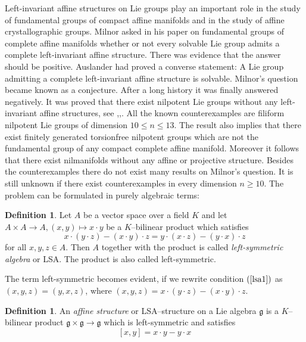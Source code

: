\documentclass[12pt]{amsart}
\theoremstyle{definition}
\newtheorem{defi}[thm]{Definition}
\theoremstyle{remark}
\newcommand{\Lg}{\mathfrak{g}}
\begin{document}
Left-invariant affine structures on Lie groups play an important role
in the study of fundamental groups of compact affine manifolds
and in the study of affine crystallographic groups. 
Milnor asked in his paper \cite{M2} on fundamental groups of complete 
affine manifolds whether or not every solvable Lie group admits a complete
left-invariant affine structure. There was evidence that the answer should 
be positive. Auslander \cite{A2} had proved a converse statement:
A Lie group admitting a complete left-invariant affine structure is solvable.
Milnor's question became known as a conjecture.
After a long history it was finally answered negatively.
It was proved that there exist nilpotent Lie groups without any left-invariant
affine structures, see \cite{B2},\cite{BG},\cite{BU3}.
All the known counterexamples are filiform nilpotent Lie groups
of dimension $10\le n \le 13$.
The result also implies that there exist
finitely generated torsionfree nilpotent groups which are not the fundamental
group of any compact complete affine manifold.
Moreover it follows that there exist nilmanifolds without any affine or
projective structure. 
Besides the counterexamples there do not exist many results on
Milnor's question. It is still unknown if there exist counterexamples
in every dimension $n\ge 10$.  
The problem can be formulated in purely algebraic terms: 

\begin{defi}
Let $A$ be a vector space
over a field $K$ and let $A \times A \rightarrow A,
(x,y) \mapsto x\cdot y$ be a $K$--bilinear product which satisfies
\begin{equation}\label{lsa1}
x\cdot (y\cdot z)-(x\cdot y)\cdot z= y\cdot (x\cdot z)-(y\cdot x)\cdot z
\end{equation}
for all $x,y,z \in A$. Then $A$ together with the product
is called {\it left-symmetric algebra} or
LSA. The product is also called left-symmetric.
\end{defi}
The term left-symmetric becomes evident, if we rewrite condition
$(\ref{lsa1})$ as
$(x,y,z)=(y,x,z)$, where $(x,y,z)=x\cdot (y\cdot z)-(x\cdot y)\cdot z$.

\begin{defi}\label{affine}
An {\it affine structure} or {LSA--structure} on a Lie algebra
$\Lg$ is a $K$--bilinear product $\Lg \times \Lg \rightarrow \Lg$
which is left-symmetric and satisfies
\begin{equation}\label{lsa2}
[x,y]=x\cdot y -y\cdot x
\end{equation}
\end{defi}
\end{document}
